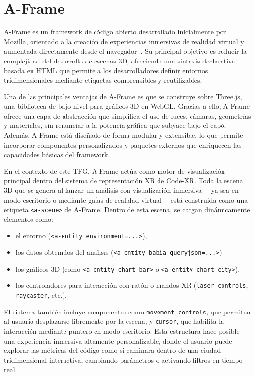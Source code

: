 \documentclass[a4paper, 12pt]{book}
\begin{document}
\section{A-Frame}
\label{sec:aframe}

A-Frame es un framework de código abierto desarrollado inicialmente por Mozilla, orientado a la creación de experiencias inmersivas de realidad virtual y aumentada directamente desde el navegador~\cite{aframe}. Su principal objetivo es reducir la complejidad del desarrollo de escenas 3D, ofreciendo una sintaxis declarativa basada en HTML que permite a los desarrolladores definir entornos tridimensionales mediante etiquetas comprensibles y reutilizables.

Una de las principales ventajas de A-Frame es que se construye sobre Three.js, una biblioteca de bajo nivel para gráficos 3D en WebGL. Gracias a ello, A-Frame ofrece una capa de abstracción que simplifica el uso de luces, cámaras, geometrías y materiales, sin renunciar a la potencia gráfica que subyace bajo el capó. Además, A-Frame está diseñado de forma modular y extensible, lo que permite incorporar componentes personalizados y paquetes externos que enriquecen las capacidades básicas del framework.

En el contexto de este TFG, A-Frame actúa como motor de visualización principal dentro del sistema de representación XR de Code-XR. Toda la escena 3D que se genera al lanzar un análisis con visualización inmersiva —ya sea en modo escritorio o mediante gafas de realidad virtual— está construida como una etiqueta \texttt{<a-scene>} de A-Frame. Dentro de esta escena, se cargan dinámicamente elementos como:

\begin{itemize}
    \item el entorno (\texttt{<a-entity environment=...>}),
    \item los datos obtenidos del análisis (\texttt{<a-entity babia-queryjson=...>}),
    \item los gráficos 3D (como \texttt{<a-entity chart-bar>} o \texttt{<a-entity chart-city>}),
    \item los controladores para interacción con ratón o mandos XR (\texttt{laser-controls}, \texttt{raycaster}, etc.).
\end{itemize}

El sistema también incluye componentes como \texttt{movement-controls}, que permiten al usuario desplazarse libremente por la escena, y \texttt{cursor}, que habilita la interacción mediante puntero en modo escritorio. Esta estructura hace posible una experiencia inmersiva altamente personalizable, donde el usuario puede explorar las métricas del código como si caminara dentro de una ciudad tridimensional interactiva, cambiando parámetros o activando filtros en tiempo real.
\end{document}
